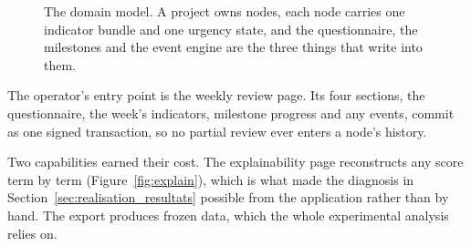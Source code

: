 \begin{figure}[H]
\caption[SupplyScore: domain model]{The domain model. A project owns nodes, each node carries
one indicator bundle and one urgency state, and the questionnaire, the milestones and the
event engine are the three things that write into them.}
\label{fig:uml}
\end{figure}

The operator's entry point is the weekly review page. Its four sections, the questionnaire,
the week's indicators, milestone progress and any events, commit as one signed transaction,
so no partial review ever enters a node's history.

Two capabilities earned their cost. The explainability page reconstructs any score term by term
(Figure~\ref{fig:explain}), which is what made the diagnosis in
Section~\ref{sec:realisation_resultats} possible from the application rather than by hand. The
export produces frozen data, which the whole experimental analysis relies on.

